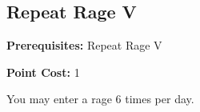 \subsection*{Repeat Rage V}\label{feat:repeatrage5}

\noindent
\textbf{Prerequisites:} Repeat Rage V

\noindent
\textbf{Point Cost:} 1

You may enter a rage 6 times per day.
